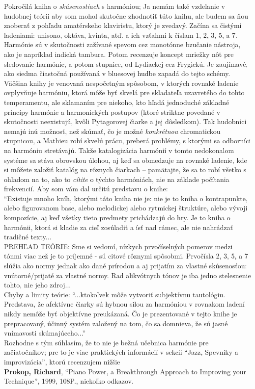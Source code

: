 \documentclass[11pt,a4paper]{book}
\begin{document}
Pokročilá kniha o \textit{skúsenostiach} s harmóniou; Ja nemám také vzdelanie v hudobnej teórii aby som mohol skutočne zhodnotiť túto knihu, ale budem sa ňou zaoberať z pohľadu amatérskeho klaviristu, ktorý je zvedavý. Začína sa čistými ladeniami: unisono, oktáva, kvinta, atď. a ich vzťahmi k číslam 1, 2, 3, 5, a 7. Harmónie sú v skutočnosti zažívané spevom cez monotónne bzučanie nástroja, ako je napríklad indická tambura. Potom recenzuje koncept mriežky nôt pre sledovanie harmónie, a potom stupnice, od Lydiackej cez Frygickú. Je zaujímavé, ako siedma čiastočná používaná v bluesovej hudbe zapadá do tejto schémy. Väčšina knihy je venovaná nespočetným spôsobom, v ktorých rovnaké ladenie ovplyvňuje harmóniu, ktorá môže byť skvelá pre skladateľa uzavretého do tohto temperamentu, ale sklamaním pre niekoho, kto hľadá jednoduché základné princípy harmónie a harmonických postupov (ktoré striktne povedané v skutočnosti neexistujú, kvôli Pytagorovej čiarke a jej dôsledkom). Tak hudobníci nemajú inú možnosť, než skúmať, čo je možné \textit{konkrétnou} chromatickou stupnicou, a Mathieu robí skvelú prácu, preberá problémy, s ktorými sa odborníci na harmóniu stretávajú. Takže katalogizácia harmónií v tomto nedokonalom systéme sa stáva obrovskou úlohou, aj keď sa obmedzuje na rovnaké ladenie, kde si môžete založiť katalóg na rôznych čiarkach – pamätajte, že sa to robí všetko s ohľadom na to, ako to \textit{cítite} o týchto harmóniách, nie na základe počítania frekvencií. Aby som vám dal určitú predstavu o knihe:\\
“Existuje mnoho kníh, ktorými táto kniha nie je: nie je to kniha o kontrapunkte, alebo figurovanom base, alebo melodickej alebo rytmickej štruktúre, alebo vývoji kompozície, aj keď všetky tieto predmety prichádzajú do hry. Je to kniha o harmónii, ktorá si kladie za cieľ zosúladiť a ísť nad rámec, ale nie nahrádzať tradičné texty...\\
PREHĽAD TEÓRIE: Sme si vedomí, nízkych prvočíselných pomerov medzi tónmi viac než je to príjemné - sú citové rôznymi spôsobmi. Prvočísla 2, 3, 5, a 7 slúžia ako normy jednak ako dané prírodou a aj prijatím za vlastné skúsenosťou: vnútorné/prijaté za vlastné normy. Rad alikvótnych tónov je iba jedno stelesnenie tohto, nie jeho zdroj...\\
Chyby a limity teórie: “...ktokoľvek môže vytvoriť subjektívnu tautológiu. Predstava, že afektívne čiarky sú hybnou silou za harmóniou v rovnakom ladení nikdy nemôže byť objektívne preukázaná. Čo je prezentované v tejto knihe je prepracovaný, účinný systém založený na tom, čo sa domnieva, že sú jasné vnímavosti skúmajúceho...”\\
Rozhodne s tým súhlasím, že to nie je bežná učebnica harmónie pre začiatočníkov; pre to je viac praktických informácií v sekcii “Jazz, Spevníky a improvizácia”, ktorú recenzujem nižšie 
\medskip\\
\textbf{\hypertarget{r:prokop}{Prokop, Richard}}, “Piano Power, a Breakthrough Approach to Improving your Technique”, 1999, 108P., niekoľko odkazov. 
\end{document}
